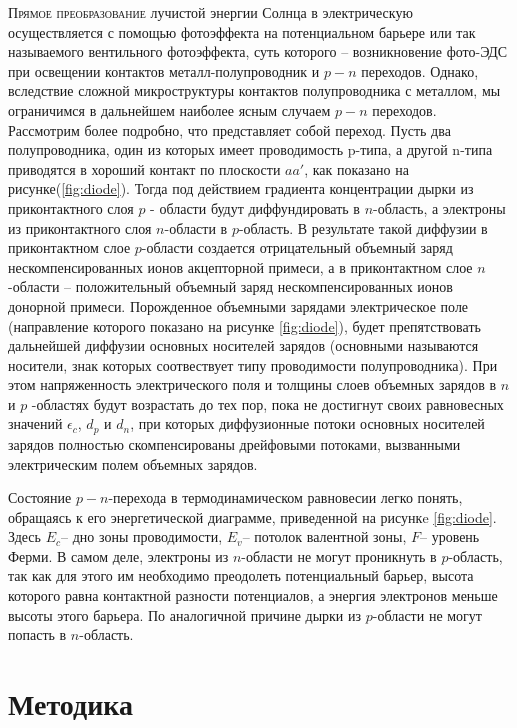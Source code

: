 \documentclass[a4paper, 12pt]{extarticle}
\begin{document}
\lettrine{\textcolor{defenition}{П}}{\textcolor{defenition}{рямое преобразование}} лучистой энергии Солнца в электрическую осуществляется с помощью фотоэффекта на потенциальном барьере или так называемого вентильного фотоэффекта, суть которого – возникновение фото-ЭДС при освещении контактов металл-полупроводник и $p-n$ переходов. Однако, вследствие сложной микроструктуры контактов полупроводника с металлом, мы ограничимся в дальнейшем наиболее ясным случаем $p-n$  переходов.
Рассмотрим более подробно, что представляет собой  переход. Пусть два полупроводника, один из которых имеет проводимость p-типа, а другой n-типа
приводятся в хороший контакт по плоскости $a a'$, как показано на рисунке(\ref{fig:diode}). Тогда под действием градиента концентрации дырки из приконтактного слоя $p$ - области будут диффундировать в $n$-область, а электроны из приконтактного слоя $n$-области в $p$-область. В результате такой диффузии в приконтактном слое $p$-области создается отрицательный объемный заряд нескомпенсированных ионов акцепторной примеси, а в приконтактном слое $n$-области – положительный объемный заряд нескомпенсированных ионов донорной примеси. Порожденное объемными зарядами электрическое поле (направление которого показано на рисунке \ref{fig:diode}), будет препятствовать дальнейшей диффузии основных носителей зарядов (основными называются носители, знак которых соотвествует типу проводимости полупроводника). При этом напряженность электрического поля  и толщины слоев объемных зарядов в $n$ и $p$ -областях будут возрастать до тех пор, пока не достигнут своих равновесных значений $\epsilon_c$, $d_p$ и $d_n$, при которых диффузионные потоки основных носителей зарядов полностью скомпенсированы дрейфовыми потоками, вызванными электрическим полем объемных зарядов. 

Состояние $p-n$-перехода в термодинамическом равновесии легко понять, обращаясь к его энергетической диаграмме, приведенной на рисункe \ref{fig:diode}. Здесь  $E_c$– дно зоны проводимости,  $E_v$– потолок валентной зоны,  $F$– уровень Ферми. В самом деле, электроны из $n$-области не могут проникнуть в $p$-область, так как для этого им необходимо преодолеть потенциальный барьер, высота  которого равна контактной разности потенциалов, а энергия электронов меньше высоты этого барьера. По аналогичной причине дырки из $p$-области не могут попасть в $n$-область.


\section*{\textcolor{header}{Методика}}
\end{document}
